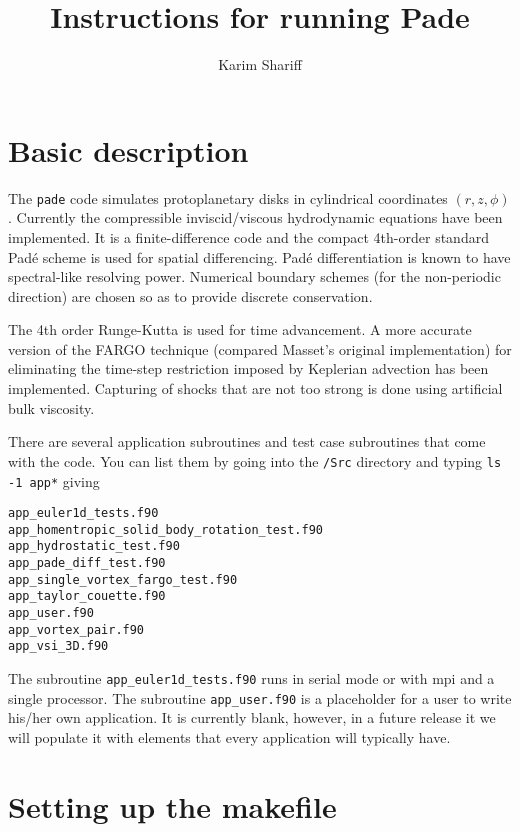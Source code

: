 \documentclass[11pt]{amsart}
\title{Instructions for running {\sc Pade}}
\author{Karim Shariff}
\begin{document}
\maketitle

\section{Basic description}
The {\tt pade} code simulates protoplanetary disks in cylindrical coordinates
$(r, z, \phi)$.  Currently the compressible inviscid/viscous hydrodynamic equations have been implemented.
It is a finite-difference code and the compact 4th-order standard Pad\'e scheme is used for spatial differencing.  
Pad\'e differentiation is known to have spectral-like resolving power.
Numerical boundary schemes (for the non-periodic direction) are chosen so as to provide discrete conservation.

The 4th order Runge-Kutta is used for time advancement.  
A more accurate version of the FARGO technique (compared Masset's original implementation) for eliminating the time-step restriction imposed by Keplerian advection has been implemented.  Capturing of shocks that are not too strong is done using artificial bulk viscosity.

There are several application subroutines and test case subroutines that come with the code.  You can list them by going into the {\tt /Src} directory and typing {\tt ls -1 app*} giving

\begin{verbatim}
app_euler1d_tests.f90
app_homentropic_solid_body_rotation_test.f90
app_hydrostatic_test.f90
app_pade_diff_test.f90
app_single_vortex_fargo_test.f90
app_taylor_couette.f90
app_user.f90
app_vortex_pair.f90
app_vsi_3D.f90
\end{verbatim}

The subroutine {\tt app\_euler1d\_tests.f90} runs in serial mode or with mpi and a single processor.  The subroutine {\tt app\_user.f90} is a placeholder for a user to write his/her own application.  It is currently blank, however, in a future release it
we will populate it with elements that every application will typically have.

\section{Setting up the makefile}
\end{document}
